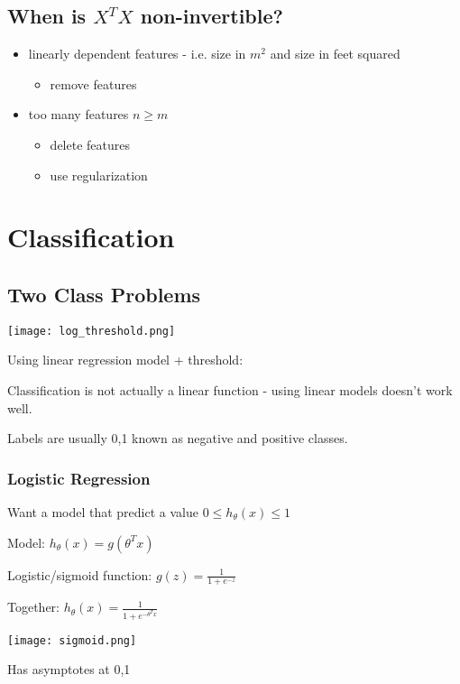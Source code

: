 \subsection{When is $X^TX$ non-invertible?}

\begin{itemize}
\item linearly dependent features - i.e. size in $m^2$ and size in feet squared
\begin{itemize}
\item remove features
\end{itemize}
\item too many features $n\ge m$ 
\begin{itemize}
  \item delete features 
  \item use regularization
\end{itemize}
\end{itemize}

\section{Classification}

\subsection{Two Class Problems}
\texttt{[image: log\_threshold.png]}

Using linear regression model + threshold:

Classification is not actually a linear function - using linear models doesn't work well.

Labels are usually {0,1} known as negative and positive classes.

\subsubsection{Logistic Regression}

Want a model that predict a value $0\le h_\theta(x)\le 1$

Model: $h_\theta(x)=g(\theta^T x)$ 

Logistic/sigmoid function: $g(z) = \frac{1}{1+e^{-z}}$

Together: $h_\theta(x)=\frac{1}{1+e^{-\theta^T x}}$

\texttt{[image: sigmoid.png]}

Has  asymptotes at {0,1}

